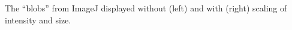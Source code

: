 \label{fig:blobs} The ``blobs'' from ImageJ displayed without (left) and with (right) scaling of intensity and size.